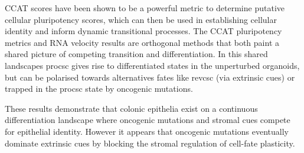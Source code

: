 CCAT scores have been shown to be a powerful metric to determine putative cellular pluripotency scores, which can then be used in establishing cellular identity and inform dynamic transitional processes. The CCAT pluripotency metrics and RNA velocity results are orthogonal methods that both paint a shared picture of competing transition and differentiation. In this shared landscapes \acrshort{procsc} gives rise to differentiated states in the unperturbed organoids, but can be polarised towards alternatives fates like \acrshort{revcsc} (via extrinsic cues) or trapped in the \acrshort{procsc} state by oncogenic mutations.

These results demonstrate that colonic epithelia exist on a continuous differentiation landscape where oncogenic mutations and stromal cues compete for epithelial identity. However it appears that oncogenic mutations eventually dominate extrinsic cues by blocking the stromal regulation of cell-fate plasticity. 